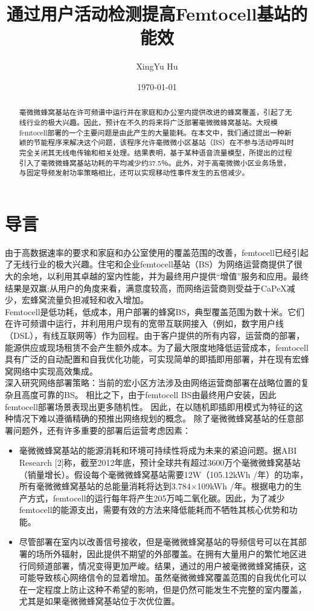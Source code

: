\documentclass{article}
\author{XingYu Hu}
\title{通过用户活动检测提高Femtocell基站的能效}
\date{\today}
\begin{document}
\maketitle

\begin{abstract}
    毫微微蜂窝基站在许可频谱中运行并在家庭和办公室内提供改进的蜂窝覆盖，引起了无线行业的极大兴趣。因此，预计在不久的将来将广泛部署毫微微蜂窝基站。大规模femtocell部署的一个主要问题是由此产生的大量能耗。在本文中，我们通过提出一种新颖的节能程序来解决这个问题，该程序允许毫微微小区基站（BS）在不参与活动呼叫时完全关闭其无线电传输和相关处理。结果表明，基于某种语音流量模型，所提出的过程引入了毫微微蜂窝基站功耗的平均减少约37.5％。此外，对于高毫微微小区业务场景，与固定导频发射功率策略相比，还可以实现移动性事件发生的五倍减少。
\end{abstract}

\section{导言}
由于高数据速率的要求和家庭和办公室使用的覆盖范围的改善，femtocell已经引起了无线行业的极大兴趣。住宅和企业femtocell基站（BS）为网络运营商提供了很大的余地，以利用其卓越的室内性能，并为最终用户提供“增值”服务和应用。最终结果是双赢;从用户的角度来看，满意度较高，而网络运营商则受益于CaPeX减少，宏蜂窝流量负担减轻和收入增加。\\

Femtocell是低功耗，低成本，用户部署的蜂窝BS，典型覆盖范围为数十米。它们在许可频谱中运行，并利用用户现有的宽带互联网接入（例如，数字用户线（DSL），有线互联网等）作为回程。由于客户提供的所有内容，运营商的部署，能源供应或现场租赁不会产生额外成本。为了最大限度地降低运营成本，femtocell具有广泛的自动配置和自我优化功能，可实现简单的即插即用部署，并在现有宏蜂窝网络中实现高效集成。\\

深入研究网络部署策略：当前的宏小区方法涉及由网络运营商部署在战略位置的复杂且高度可靠的BS。
相比之下，由于femtocell BS由最终用户安装，因此femtocell部署场景表现出更多随机性。
因此，在以随机即插即用模式为特征的这种情况下难以遵循精确的预推出网络规划的概念。
除了毫微微蜂窝基站的任意部署问题外，还有许多重要的部署后运营考虑因素：
\begin{itemize}
    \item 毫微微蜂窝基站的能源消耗和环境可持续性将成为未来的紧迫问题。据ABI Research [2]称，截至2012年底，预计全球共有超过3600万个毫微微蜂窝基站（销量增长）。假设每个毫微微蜂窝基站需要12W（105.12kWh /年）的功率，所有毫微微蜂窝基站的总能量消耗将达到3.784×109kWh /年。根据电力的生产方式，femtocell的运行每年将产生205万吨二氧化碳。因此，为了减少femtocell的能源支出，需要有效的方法来降低能耗而不牺牲其核心优势和功能。
    \item 尽管部署在室内以改善信号接收，但是毫微微蜂窝基站的导频信号可以在其部署的场所外辐射，因此提供不期望的外部覆盖。在拥有大量用户的繁忙地区进行同频道部署，情况变得更加严峻。结果，通过的用户被毫微微蜂窝捕获，这可能导致核心网络信令的显着增加。虽然毫微微蜂窝覆盖范围的自我优化可以在一定程度上防止这种不希望的影响，但是仍然可能发生不完整的室内覆盖，尤其是如果毫微微蜂窝基站位于次优位置。
\end{itemize}
\end{document}
